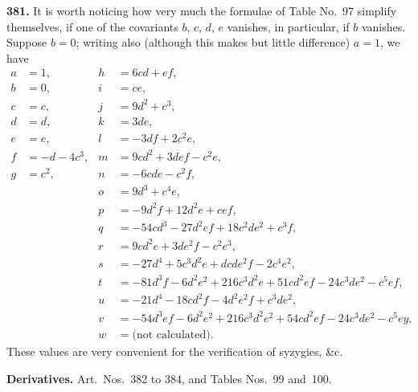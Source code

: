 \documentclass[12pt,a4paper]{article}
\begin{document}
\noindent\textbf{381.} It is worth noticing how very much the formulae of Table No.~97 simplify themselves, if one of the covariants $b$, $c$, $d$, $e$ vanishes, in particular, if $b$ vanishes. Suppose $b = 0$; writing also (although this makes but little difference) $a = 1$, we have
\begin{align*}
a &= 1, & h &= 6cd + ef, \\
b &= 0, & i &= ce, \\
c &= c, & j &= 9d^2 + c^3, \\
d &= d, & k &= 3de, \\
e &= e, & l &= -3df + 2c^2 e, \\
f &= -d - 4c^3, & m &= 9cd^2 + 3def - c^2 e, \\
g &= c^2, & n &= -6cde - c^2 f, \\
& & o &= 9d^3 + c^4 e, \\
& & p &= -9d^2 f + 12d^2 e + cef, \\
& & q &= -54cd^3 - 27d^2 ef + 18c^2 de^2 + c^3 f, \\
& & r &= 9cd^2 e + 3de^2 f - c^2 e^3, \\
& & s &= -27d^4 + 5c^3 d^2 e + dcde^2 f - 2c^4 e^2, \\
& & t &= -81d^3 f - 6d^2 e^2 + 216c^3 d^2 e + 51cd^2 ef - 24c^3 de^2 - c^5 ef, \\
& & u &= -21d^4 - 18cd^2 f - 4d^2 e^2 f + c^3 de^2, \\
& & v &= -54d^3 ef - 6d^2 e^2 + 216c^3 d^2 e^2 + 54cd^2 ef - 24c^3 de^2 - c^5 ey, \\
& & w &= \text{(not calculated)}.
\end{align*}
These values are very convenient for the verification of syzygies, \&c.

\newpage
\noindent\textbf{Derivatives.} Art.\ Nos.\ 382 to 384, and Tables Nos.~99 and~100.

\medskip
\end{document}
